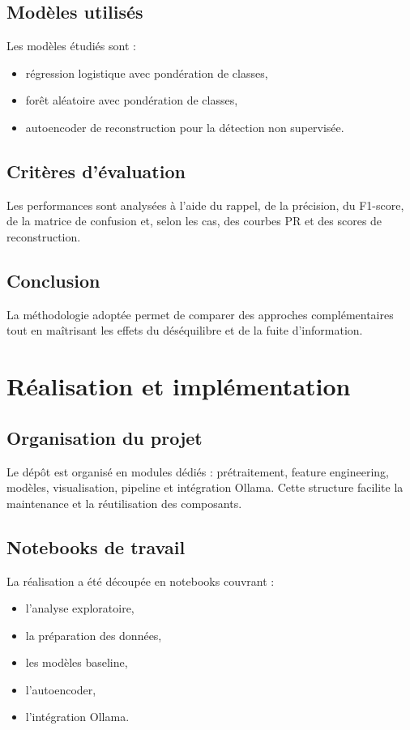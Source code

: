 \documentclass[12pt,a4paper,twoside]{report}
\begin{document}
\section{Modèles utilisés}
Les modèles étudiés sont :
\begin{itemize}
  \item régression logistique avec pondération de classes,
  \item forêt aléatoire avec pondération de classes,
  \item autoencoder de reconstruction pour la détection non supervisée.
\end{itemize}

\section{Critères d'évaluation}
Les performances sont analysées à l'aide du rappel, de la précision, du F1-score, de la matrice de confusion et, selon les cas, des courbes PR et des scores de reconstruction.

\section{Conclusion}
La méthodologie adoptée permet de comparer des approches complémentaires tout en maîtrisant les effets du déséquilibre et de la fuite d'information.

\chapter{Réalisation et implémentation}

\section{Organisation du projet}
Le dépôt est organisé en modules dédiés : prétraitement, feature engineering, modèles, visualisation, pipeline et intégration Ollama. Cette structure facilite la maintenance et la réutilisation des composants.

\section{Notebooks de travail}
La réalisation a été découpée en notebooks couvrant :
\begin{itemize}
  \item l'analyse exploratoire,
  \item la préparation des données,
  \item les modèles baseline,
  \item l'autoencoder,
  \item l'intégration Ollama.
\end{itemize}
\end{document}

